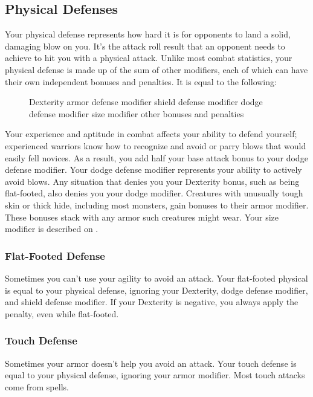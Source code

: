 \subsection{Physical Defenses}
Your physical defense represents how hard it is for opponents to land a solid, damaging blow on you. It's the attack roll result that an opponent needs to achieve to hit you with a physical attack. Unlike most combat statistics, your physical defense is made up of the sum of other modifiers, each of which can have their own independent bonuses and penalties. It is equal to the following:

\begin{figure}[h]
     \add Dexterity \add armor defense modifier \add shield defense modifier \add dodge defense modifier \add size modifier \add other bonuses and penalties
\end{figure}

 Your experience and aptitude in combat affects your ability to defend yourself; experienced warriors know how to recognize and avoid or parry blows that would easily fell novices. As a result, you add half your base attack bonus to your dodge defense modifier.
 Your dodge defense modifier represents your ability to actively avoid blows. Any situation that denies you your Dexterity bonus, such as being flat-footed, also denies you your dodge modifier.
 Creatures with unusually tough skin or thick hide, including most monsters, gain bonuses to their armor modifier. These bonuses stack with any armor such creatures might wear.
 Your size modifier is described on .

\subsubsection{Flat-Footed Defense}
Sometimes you can't use your agility to avoid an attack. Your flat-footed physical is equal to your physical defense, ignoring your Dexterity, dodge defense modifier, and shield defense modifier. If your Dexterity is negative, you always apply the penalty, even while flat-footed.

\subsubsection{Touch Defense}
Sometimes your armor doesn't help you avoid an attack. Your touch defense is equal to your physical defense, ignoring your armor modifier. Most touch attacks come from spells.

